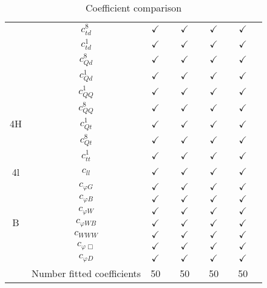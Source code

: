 \documentclass{article}
\begin{document}
\begin{table}[H]
\begin{tabular}{|c|c|c|c|c|c|c|c|c|c|}
 & $c_{td}^{8}$ & $\checkmark$ &  & $\checkmark$ &  & $\checkmark$ &  & $\checkmark$ & \\ \cline{2-10}
 & $c_{td}^{1}$ & $\checkmark$ &  & $\checkmark$ &  & $\checkmark$ &  & $\checkmark$ & \\ \cline{2-10}
 & $c_{Qd}^{8}$ & $\checkmark$ &  & $\checkmark$ &  & $\checkmark$ &  & $\checkmark$ & \\ \cline{2-10}
 & $c_{Qd}^{1}$ & $\checkmark$ &  & $\checkmark$ &  & $\checkmark$ &  & $\checkmark$ & 
\\ \hline
\multirow{5}{*}{4H}
 & $c_{QQ}^{1}$ & $\checkmark$ &  & $\checkmark$ &  & $\checkmark$ &  & $\checkmark$ & \\ \cline{2-10}
 & $c_{QQ}^{8}$ & $\checkmark$ &  & $\checkmark$ &  & $\checkmark$ &  & $\checkmark$ & \\ \cline{2-10}
 & $c_{Qt}^{1}$ & $\checkmark$ &  & $\checkmark$ &  & $\checkmark$ &  & $\checkmark$ & \\ \cline{2-10}
 & $c_{Qt}^{8}$ & $\checkmark$ &  & $\checkmark$ &  & $\checkmark$ &  & $\checkmark$ & \\ \cline{2-10}
 & $c_{tt}^{1}$ & $\checkmark$ &  & $\checkmark$ &  & $\checkmark$ &  & $\checkmark$ & 
\\ \hline
\multirow{1}{*}{4l}
 & $c_{ll}$ & $\checkmark$ &  & $\checkmark$ &  & $\checkmark$ &  & $\checkmark$ & 
\\ \hline
\multirow{7}{*}{B}
 & $c_{\varphi G}$ & $\checkmark$ &  & $\checkmark$ &  & $\checkmark$ &  & $\checkmark$ & \\ \cline{2-10}
 & $c_{\varphi B}$ & $\checkmark$ &  & $\checkmark$ &  & $\checkmark$ &  & $\checkmark$ & \\ \cline{2-10}
 & $c_{\varphi W}$ & $\checkmark$ &  & $\checkmark$ &  & $\checkmark$ &  & $\checkmark$ & \\ \cline{2-10}
 & $c_{\varphi WB}$ & $\checkmark$ &  & $\checkmark$ &  & $\checkmark$ &  & $\checkmark$ & \\ \cline{2-10}
 & $c_{WWW}$ & $\checkmark$ &  & $\checkmark$ &  & $\checkmark$ &  & $\checkmark$ & \\ \cline{2-10}
 & $c_{\varphi \Box}$ & $\checkmark$ &  & $\checkmark$ &  & $\checkmark$ &  & $\checkmark$ & \\ \cline{2-10}
 & $c_{\varphi D}$ & $\checkmark$ &  & $\checkmark$ &  & $\checkmark$ &  & $\checkmark$ & 
\\ \hline
\hline & Number fitted coefficients & 50 &  & 50 &  & 50 &  & 50 &  \\ \hline
\end{tabular}
\caption{Coefficient comparison}
\end{table}
\end{document}
